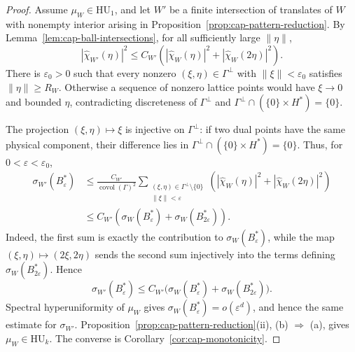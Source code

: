 \documentclass[11pt,reqno,a4paper]{amsart}
\numberwithin{equation}{section}
\theoremstyle{compact}
\theoremstyle{definition}
\theoremstyle{definition}
\newcommand{\HU}{\mathrm{HU}}
\begin{document}
\begin{proof}
Assume \(\mu_W\in\HU_1\), and let \(W'\) be a finite intersection of translates of \(W\) with nonempty interior arising in
Proposition~\ref{prop:cap-pattern-reduction}.  By
Lemma~\ref{lem:cap-ball-intersections}, for all sufficiently large
\(\|\eta\|\),
\begin{equation}\label{eq:cap-derived-ball-fourier-comparison}
  |\widehat{\chi}_{W'}(\eta)|^2
  \leq C_{W'}\left(
    |\widehat{\chi}_W(\eta)|^2
    +|\widehat{\chi}_W(2\eta)|^2
  \right).
\end{equation}
There is \(\varepsilon_0>0\) such that every nonzero
\((\xi,\eta)\in\Gamma^\perp\) with \(\|\xi\|<\varepsilon_0\) satisfies
\(\|\eta\|\geq R_W\).  Otherwise a sequence of nonzero lattice points
would have \(\xi\to0\) and bounded \(\eta\), contradicting discreteness of
\(\Gamma^\perp\) and
\(\Gamma^\perp\cap(\{0\}\times H^*)=\{0\}\).

The projection \((\xi,\eta)\mapsto\xi\) is injective on \(\Gamma^\perp\):
if two dual points have the same physical component, their difference lies in
\(\Gamma^\perp\cap(\{0\}\times H^*)=\{0\}\).  Thus, for
\(0<\varepsilon<\varepsilon_0\),
\begin{align*}
 \sigma_{W'}(B_\varepsilon^*)
 &\leq \frac{C_{W'}}{\operatorname{covol}(\Gamma)^2}
   \sum_{\substack{(\xi,\eta)\in\Gamma^\perp\setminus\{0\}\\
                    \|\xi\|<\varepsilon}}
   \left(|\widehat\chi_W(\eta)|^2
        +|\widehat\chi_W(2\eta)|^2\right)\\
 &\leq C_{W'}\left(
      \sigma_W(B_\varepsilon^*)+\sigma_W(B_{2\varepsilon}^*)
    \right).
\end{align*}
Indeed, the first sum is exactly the contribution to
\(\sigma_W(B_\varepsilon^*)\), while the map
\((\xi,\eta)\mapsto(2\xi,2\eta)\) sends the second sum injectively into the
terms defining \(\sigma_W(B_{2\varepsilon}^*)\).  Hence
\begin{equation}\label{eq:cap-derived-ball-spectrum-comparison}
  \sigma_{W'}(B_\varepsilon^*)
  \leq C_{W'}\bigl(
    \sigma_W(B_\varepsilon^*)+\sigma_W(B_{2\varepsilon}^*)
  \bigr).
\end{equation}
Spectral hyperuniformity of \(\mu_W\) gives
\(\sigma_W(B_\varepsilon^*)=o(\varepsilon^d)\), and hence the same estimate
for \(\sigma_{W'}\).  Proposition~\ref{prop:cap-pattern-reduction}(ii),
\textup{(b)} $\Rightarrow$ \textup{(a)}, gives $\mu_W\in\HU_k$.  The converse is
Corollary~\ref{cor:cap-monotonicity}.
\end{proof}
\end{document}
